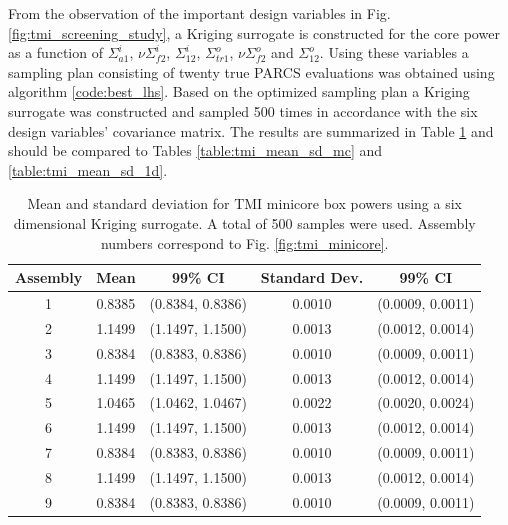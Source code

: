 From the observation of the important design variables in Fig. \ref{fig:tmi_screening_study}, a Kriging surrogate is constructed for the core power as a function of $\Sigma_{a1}^i$, $\nu\Sigma_{f2}^i$, $\Sigma_{12}^i$, $\Sigma_{tr1}^o$, $\nu\Sigma_{f2}^o$ and $\Sigma_{12}^o$. Using these variables a sampling plan consisting of twenty true \ac{PARCS} evaluations was obtained using algorithm \ref{code:best_lhs}. Based on the optimized sampling plan a Kriging surrogate was constructed and sampled 500 times in accordance with the six design variables' covariance matrix. The results are summarized in Table \ref{table:tmi_mean_sd_kriging} and should be compared to Tables \ref{table:tmi_mean_sd_mc} and \ref{table:tmi_mean_sd_1d}. 
\begin{table}[!htb] 
\caption[Mean and standard deviation for \ac{TMI} minicore box powers using a six dimensional Kriging surrogate.]{\label{table:tmi_mean_sd_kriging} 
Mean and standard deviation for \ac{TMI} minicore box powers using a six dimensional Kriging surrogate. A total of 500 samples were used. Assembly numbers correspond to Fig. \ref{fig:tmi_minicore}.}
\centering
\begin{tabular}{||c|c|c|c|c||} 
\hline \hline
\textbf{Assembly} & \textbf{Mean} & \textbf{99\% CI} & \textbf{Standard Dev.} & \textbf{99\% CI} \\ \hline
1 & 0.8385 & (0.8384, 0.8386) & 0.0010 & (0.0009, 0.0011) \\ \hline 
2 & 1.1499 & (1.1497, 1.1500) & 0.0013 & (0.0012, 0.0014) \\ \hline
3 & 0.8384 & (0.8383, 0.8386) & 0.0010 & (0.0009, 0.0011) \\ \hline
4 & 1.1499 & (1.1497, 1.1500) & 0.0013 & (0.0012, 0.0014) \\ \hline
5 & 1.0465 & (1.0462, 1.0467) & 0.0022 & (0.0020, 0.0024) \\ \hline
6 & 1.1499 & (1.1497, 1.1500) & 0.0013 & (0.0012, 0.0014) \\ \hline
7 & 0.8384 & (0.8383, 0.8386) & 0.0010 & (0.0009, 0.0011) \\ \hline
8 & 1.1499 & (1.1497, 1.1500) & 0.0013 & (0.0012, 0.0014) \\ \hline
9 & 0.8384 & (0.8383, 0.8386) & 0.0010 & (0.0009, 0.0011) \\
\hline \hline
\end{tabular}
\end{table}
